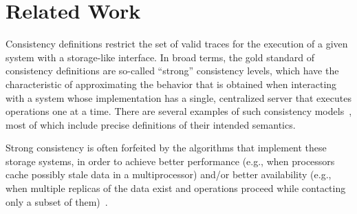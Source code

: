 \documentclass[journal,compsoc]{IEEEtran}
\begin{document}

 \section{Related Work} \label{sec:related}
 Consistency definitions restrict the set of valid traces for the execution of a given system with a storage-like interface. In broad terms, the gold standard of consistency definitions are so-called ``strong'' consistency levels, which have the characteristic of approximating the behavior that is obtained when interacting with a system whose implementation has a single, centralized server that executes operations one at a time. There are several examples of such consistency models~\cite{Ahamad94causalmemory:, Attiya:1994:SCV:176575.176576, Herlihy:1990:LCC:78969.78972, Lamport:1979:MMC:1311099.1311750, opac-b1024856, Mizuno1995, Raynal1995}, most of which include precise definitions of their intended semantics. 

Strong consistency is often forfeited by the algorithms that implement these storage systems, in order to achieve better performance (e.g., when processors cache possibly stale data in a multiprocessor) and/or better availability (e.g., when multiple replicas of the data exist and operations proceed while contacting only a subset of them)~\cite{Lakshman:2010:CDS:1773912.1773922, Sumbaly_servinglarge-scale, Meiklejohn:2013:RPD:2505305.2505309, Plugge:2010:DGM:1869938, Schutt:2008:SRT:1411273.1411280, DeCandia:2007:DAH:1323293.1294281}.
\end{document}
